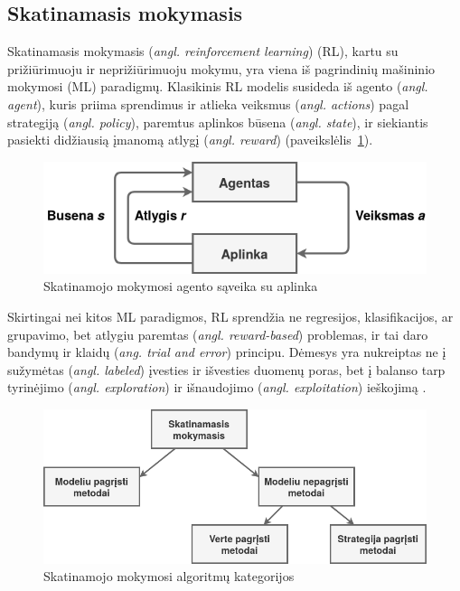 \documentclass{VUMIFPSbakalaurinis}
\begin{document}
\subsection{Skatinamasis mokymasis}\label{subsec:RL} 
{
	Skatinamasis mokymasis (\textit{angl. reinforcement learning}) (RL), kartu su prižiūrimuoju ir neprižiūrimuoju mokymu, yra viena iš pagrindinių mašininio mokymosi (ML) paradigmų. Klasikinis RL modelis susideda iš agento (\textit{angl. agent}), kuris priima sprendimus ir atlieka veiksmus (\textit{angl. actions}) pagal strategiją  (\textit{angl. policy}), paremtus aplinkos būsena (\textit{angl. state}), ir siekiantis pasiekti didžiausią įmanomą atlygį (\textit{angl. reward}) (paveikslėlis~\ref{img:rl}).\par
	
	\begin{figure}[H]
		\centering
		\includegraphics[scale=0.33]{img/rl}
		\caption{Skatinamojo mokymosi agento sąveika su aplinka}
		\label{img:rl}
	\end{figure} 
	
	Skirtingai nei kitos ML paradigmos, RL sprendžia ne regresijos, klasifikacijos, ar grupavimo, bet atlygiu paremtas (\textit{angl. reward-based}) problemas, ir tai daro bandymų ir klaidų (\textit{ang. trial and error}) principu. Dėmesys yra nukreiptas ne į sužymėtas (\textit{angl. labeled}) įvesties ir išvesties duomenų poras, bet į balanso tarp tyrinėjimo (\textit{angl. exploration}) ir išnaudojimo (\textit{angl. exploitation}) ieškojimą \cite{kaelbling_littman_moore}.\par
	
	\begin{figure}[H]
		\centering
		\includegraphics[scale=0.33]{img/rl_overview}
		\caption{Skatinamojo mokymosi algoritmų kategorijos}
		\label{img:rl_overview}
	\end{figure} 
	
}
\end{document}
